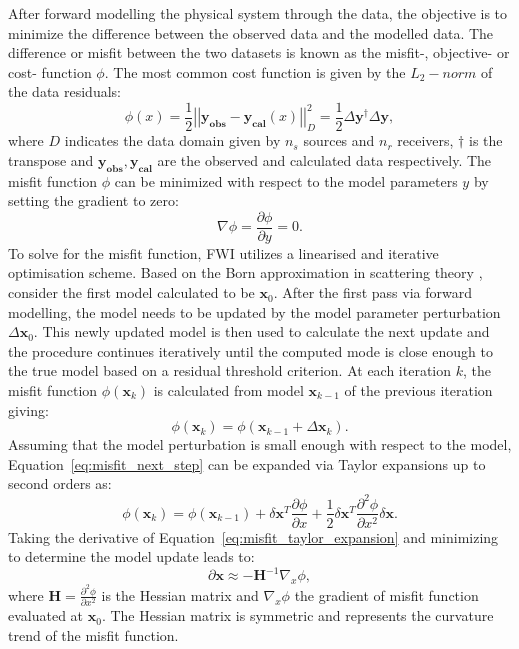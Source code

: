 After forward modelling the physical system through the data, the objective is to minimize the difference between the observed data and the modelled data. The difference or misfit between the two datasets is known as the misfit-, objective- or cost- function $\phi$. The most common cost function is given by the $L_2-norm$ of the data residuals:
\begin{equation}\label{eq:l2_norm}
	\phi(x)= \frac{1}{2}\left|\left| \boldsymbol{y}_{\boldsymbol{obs}} - \boldsymbol{y}_{\boldsymbol{cal}}(x) \right|\right|_D^2 =\frac{1}{2}\Delta\boldsymbol{y}^\dagger\Delta\boldsymbol{y},
\end{equation}
where $D$ indicates the data domain given by $n_s$ sources and $n_r$ receivers, $\dagger$ is the transpose and $\boldsymbol{y}_{\boldsymbol{obs}},\boldsymbol{y}_{\boldsymbol{cal}}$ are the observed and calculated data respectively. The misfit function $\phi$ can be minimized with respect to the model parameters $y$ by setting the gradient to zero: 
\begin{equation}
	\nabla\phi=\frac{\partial\phi}{\partial y} = 0.
\end{equation}
To solve for the misfit function, FWI utilizes a linearised and iterative optimisation scheme. Based on the Born approximation in scattering theory \citep{Born1980}, consider the first model calculated to be $\boldsymbol{x}_0$. After the first pass via forward modelling, the model needs to be updated by the model parameter perturbation $\Delta \boldsymbol{x}_0$. This newly updated model is then used to calculate the next update and the procedure continues iteratively until the computed mode is close enough to the true model based on a residual threshold criterion. At each iteration $k$, the misfit function $\phi(\boldsymbol{x}_k )$ is calculated from model $\boldsymbol{x}_{k-1}$ of the previous iteration giving:
\begin{equation}\label{eq:misfit_next_step}
	\phi(\boldsymbol{x}_k)=\phi(\boldsymbol{x}_{k-1} + \Delta\boldsymbol{x}_k).
\end{equation}
Assuming that the model perturbation is small enough with respect to the model, Equation~\ref{eq:misfit_next_step} can be expanded via Taylor expansions up to second orders as:
\begin{equation}\label{eq:misfit_taylor_expansion}
	\phi(\boldsymbol{x}_k) = \phi(\boldsymbol{x}_{k-1}) + \delta\boldsymbol{x}^T\frac{\partial\phi}{\partial x}+\frac{1}{2}\delta\boldsymbol{x}^T\frac{\partial^2\phi}{\partial x^2}\delta\boldsymbol{x}.
\end{equation}
Taking the derivative of Equation~\ref{eq:misfit_taylor_expansion} and minimizing to determine the model update leads to:
\begin{equation}\label{eq:hessian}
	\partial\boldsymbol{x}\approx-\boldsymbol{H}^{-1}\nabla_x\phi,
\end{equation}
where $\boldsymbol{H}=\frac{\partial^2\phi}{\partial x^2}$ is the Hessian matrix and $\nabla_x\phi$ the gradient of misfit function evaluated at $\boldsymbol{x}_0$. The Hessian matrix is symmetric and represents the curvature trend of the misfit function.
